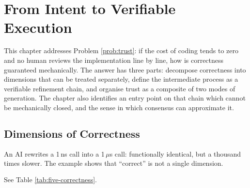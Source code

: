 \chapter[From Intent to Verifiable Execution]{From Intent to Verifiable Execution}\label{ch:intent}

This chapter addresses Problem \ref{prob:trust}: if the cost of coding tends to zero and no
human reviews the implementation line by line, how is correctness guaranteed
mechanically. The answer has three parts: decompose correctness into dimensions that can be
treated separately, define the intermediate process as a verifiable refinement chain, and
organise trust as a composite of two modes of generation. The chapter also identifies an
entry point on that chain which cannot be mechanically closed, and the sense in which
consensus can approximate it.

\section{Dimensions of Correctness}\label{sec:five-correctness}

An AI rewrites a 1\,ns call into a 1\,$\mu$s call: functionally identical, but a thousand
times slower. The example shows that ``correct'' is not a single dimension.

\begin{definition}\label{def:five-correctness}
See Table \ref{tab:five-correctness}.
\end{definition}

